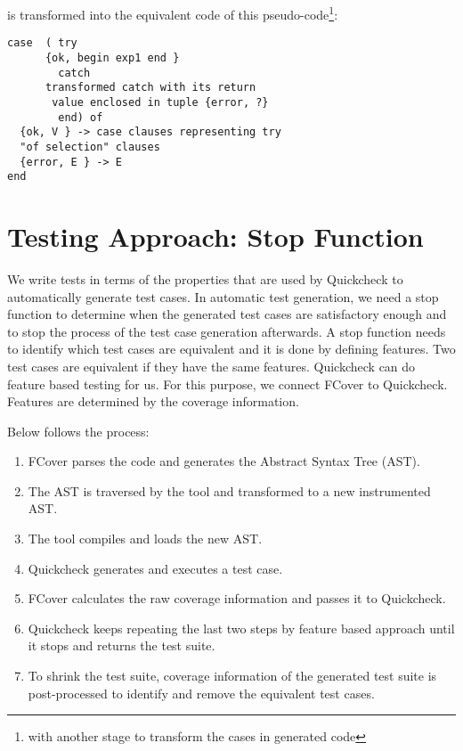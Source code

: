 \documentclass[12pt,a4paper]{report}
\begin{document}
is transformed into the equivalent code of this pseudo-code\footnote{with another stage to transform the cases in generated code}:

\begin{lstlisting}
case  ( try
	  {ok, begin exp1 end }
        catch        
	  transformed catch with its return
	   value enclosed in tuple {error, ?}
        end) of
  {ok, V } -> case clauses representing try
  "of selection" clauses
  {error, E } -> E
end
\end{lstlisting}

\section{Testing Approach: Stop Function}
We write tests in terms of the properties that are used by Quickcheck\cite{claessen2000quickcheck} to automatically generate test cases. In automatic test generation, we need a stop function to determine when the generated test cases are satisfactory enough and to stop the process of the test case generation afterwards. A stop function needs to identify which test cases are equivalent and it is done by defining features. Two test cases are equivalent if they have the same features. Quickcheck can do feature based testing for us. For this purpose, we connect FCover to Quickcheck. Features are determined by the coverage information.

Below follows the process:
\begin{enumerate}
 \item FCover parses the code and generates the Abstract Syntax Tree (AST).
 \item The AST is traversed by the tool and transformed to a new instrumented AST.
 \item The tool compiles and loads the new AST.
 \item Quickcheck generates and executes a test case.
 \item FCover calculates the raw coverage information and passes it to Quickcheck.
 \item Quickcheck keeps repeating the last two steps by feature based approach until it stops and returns the test suite.  
 \item To shrink the test suite, coverage information of the generated test suite is post-processed to identify and remove the equivalent test cases.
\end{enumerate}
\newpage
{}


\end{document}
